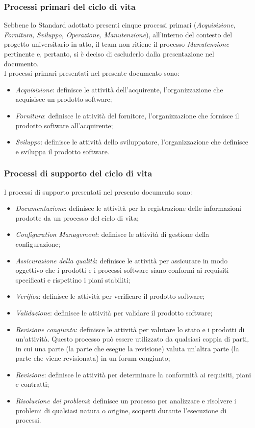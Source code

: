\documentclass[10pt, a4paper]{article}
\begin{document}
\subsubsection{Processi primari del ciclo di vita}
Sebbene lo Standard adottato presenti cinque processi primari (\textit{Acquisizione, Fornitura, Sviluppo, Operazione, Manutenzione}),
all'interno del contesto del progetto universitario in atto, il team non ritiene il processo \textit{Manutenzione} pertinente e, pertanto, 
si è deciso di escluderlo dalla presentazione nel documento.\\
I processi primari presentati nel presente documento sono:
\begin{itemize}
    \item \textit{Acquisizione}: definisce le attività dell'acquirente, l'organizzazione che acquisisce un prodotto software;
    \item \textit{Fornitura}: definisce le attività del fornitore, l'organizzazione che fornisce il prodotto software all'acquirente;
    \item \textit{Sviluppo}: definisce le attività dello sviluppatore, l'organizzazione che definisce e sviluppa il prodotto software.
\end{itemize}

\subsubsection{Processi di supporto del ciclo di vita}
I processi di supporto presentati nel presento documento sono:
\begin{itemize}
    \item \textit{Documentazione}: definisce le attività per la registrazione delle informazioni prodotte da un processo del ciclo di vita;
    \item \textit{Configuration Management}: definisce le attività di gestione della configurazione;
    \item \textit{Assicurazione della qualità}: definisce le attività per assicurare in modo oggettivo che i prodotti e i processi software
    siano conformi ai requisiti specificati e rispettino i piani stabiliti;
    \item \textit{Verifica}: definisce le attività per verificare il prodotto software;
    \item \textit{Validazione}: definisce le attività per validare il prodotto software;
    \item \textit{Revisione congiunta}: definisce le attività per valutare lo stato e i prodotti di un'attività. Questo processo può essere 
    utilizzato da qualsiasi coppia di parti, in cui una parte (la parte che esegue la revisione) valuta un'altra parte (la parte che viene revisionata)
    in un forum congiunto;
    \item \textit{Revisione}: definisce le attività per determinare la conformità ai requisiti, piani e contratti;
    \item \textit{Risoluzione dei problemi}: definisce un processo per analizzare e risolvere i problemi di qualsiasi natura o origine, scoperti
    durante l'esecuzione di processi.
\end{itemize}
\end{document}
